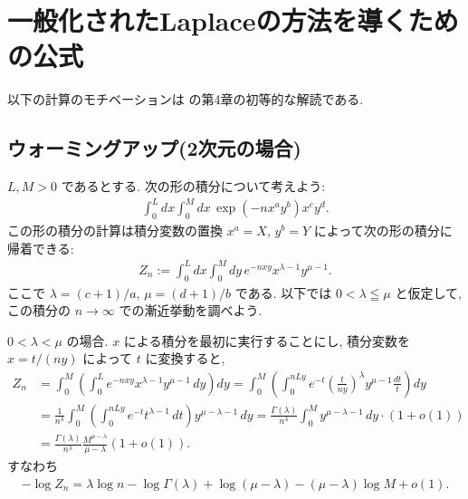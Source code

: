 \documentclass[12pt,twoside]{jarticle}
\theoremstyle{jplain}
\theoremstyle{jplain}
\theoremstyle{jplain}
\numberwithin{theorem}{section}
\numberwithin{equation}{section}
\numberwithin{figure}{section}
\numberwithin{table}{section}
\begin{document}

\section{一般化されたLaplaceの方法を導くための公式}

以下の計算のモチベーションは \cite{watanabe-2012} の第4章の初等的な解読である.


\subsection{ウォーミングアップ(2次元の場合)}

$L,M>0$ であるとする.
次の形の積分について考えよう:
\begin{align*}
\int_0^L dx \int_0^M dx\, \exp\left(-n x^a y^b \right) x^c y^d.
\end{align*}
この形の積分の計算は積分変数の置換 $x^a=X$, $y^b=Y$ によって次の形の積分に帰着できる:
\begin{align*}
Z_n:=\int_0^L dx \int_0^M dy\, e^{-nxy} x^{\lambda-1} y^{\mu-1}.
\end{align*}
ここで $\lambda=(c+1)/a$, $\mu=(d+1)/b$ である.
以下では $0<\lambda\leqq\mu$ と仮定して, この積分の $n\to\infty$ での漸近挙動を調べよう.

$0<\lambda<\mu$ の場合.  $x$ による積分を最初に実行することにし,
積分変数を $x=t/(ny)$ によって $t$ に変換すると,
\begin{align*}
Z_n
&= \int_0^M \left(\int_0^L e^{-nxy} x^{\lambda-1}y^{\mu-1}\,dy\right)dy
=\int_0^M \left(\int_0^{nLy} e^{-t} \left(\frac{t}{ny}\right)^\lambda y^{\mu-1}\frac{dt}{t}\right)dy
\\ &
=\frac{1}{n^\lambda}\int_0^M \left(\int_0^{nLy} e^{-t} t^{\lambda-1}\,dt\right)y^{\mu-\lambda-1}\,dy
=\frac{\Gamma(\lambda)}{n^\lambda}\int_0^M y^{\mu-\lambda-1}\,dy\cdot(1+o(1))
\\ &
=\frac{\Gamma(\lambda)}{n^\lambda}\frac{M^{\mu-\lambda}}{\mu-\lambda}(1+o(1)).
\end{align*}
すなわち
\begin{align*}
-\log Z_n = \lambda\log n -\log\Gamma(\lambda)+ \log(\mu-\lambda)-(\mu-\lambda)\log M + o(1).
\end{align*}
\end{document}

